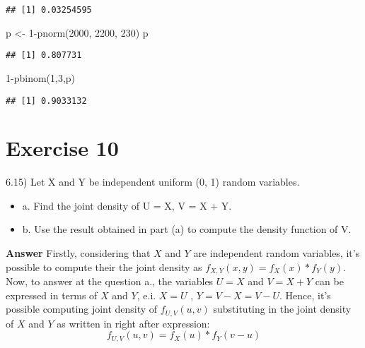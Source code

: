 \documentclass[
]{article}
\newenvironment{Shaded}{\begin{snugshade}}{\end{snugshade}}
\newcommand{\DecValTok}[1]{\textcolor[rgb]{0.00,0.00,0.81}{#1}}
\newcommand{\FunctionTok}[1]{\textcolor[rgb]{0.00,0.00,0.00}{#1}}
\newcommand{\NormalTok}[1]{#1}
\newcommand{\OtherTok}[1]{\textcolor[rgb]{0.56,0.35,0.01}{#1}}
\newcommand{\SpecialCharTok}[1]{\textcolor[rgb]{0.00,0.00,0.00}{#1}}
\providecommand{\tightlist}{%
  \setlength{\itemsep}{0pt}\setlength{\parskip}{0pt}}
\begin{document}
\begin{verbatim}
## [1] 0.03254595
\end{verbatim}

\begin{Shaded}
\begin{Highlighting}[]
\NormalTok{p }\OtherTok{\textless{}{-}} \DecValTok{1}\SpecialCharTok{{-}}\FunctionTok{pnorm}\NormalTok{(}\DecValTok{2000}\NormalTok{, }\DecValTok{2200}\NormalTok{, }\DecValTok{230}\NormalTok{)}
\NormalTok{p}
\end{Highlighting}
\end{Shaded}

\begin{verbatim}
## [1] 0.807731
\end{verbatim}

\begin{Shaded}
\begin{Highlighting}[]
\DecValTok{1}\SpecialCharTok{{-}}\FunctionTok{pbinom}\NormalTok{(}\DecValTok{1}\NormalTok{,}\DecValTok{3}\NormalTok{,p)}
\end{Highlighting}
\end{Shaded}

\begin{verbatim}
## [1] 0.9033132
\end{verbatim}

\hypertarget{exercise-10}{%
\section{Exercise 10}\label{exercise-10}}

6.15) Let X and Y be independent uniform (0, 1) random variables.

\begin{itemize}
\tightlist
\item
  a. Find the joint density of U = X, V = X + Y.
\item
  b. Use the result obtained in part (a) to compute the density function
  of V.
\end{itemize}

\textbf{Answer} Firstly, considering that \(X\) and \(Y\) are
independent random variables, it's possible to compute their the joint
density as \(f_{X, Y}(x, y)=f_X(x)*f_Y(y)\). Now, to answer at the
question a., the variables \(U=X\) and \(V=X+Y\) can be expressed in
terms of \(X\) and \(Y\), e.i. \(X=U\) , \(Y=V-X=V-U\). Hence, it's
possible computing joint density of \(f_{U, V}(u, v)\) substituting in
the joint density of \(X\) and \(Y\) as written in right after
expression: \[f_{U, V}(u, v)=f_X(u)*f_Y(v-u)\]
\end{document}
